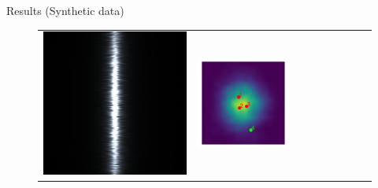 \documentclass[final]{beamer}
\newlength{\twocolwid}
\newlength{\resultwidth}
\begin{document}
\begin{frame}[t]
\begin{columns}[t]
\begin{column}{\twocolwid}
\begin{block}{Results (Synthetic data)}
\begin{figure}[t]
\begin{tabular}{ccrclcccc}
            		\includegraphics[width=\resultwidth]{synth/metal/optim.jpg} &
            		\includegraphics[width=\resultwidth]{synth/metal/posterior.pdf} &

\end{tabular}
\end{figure}
\end{block}
\end{column}
\end{columns}
\end{frame}
\end{document}
